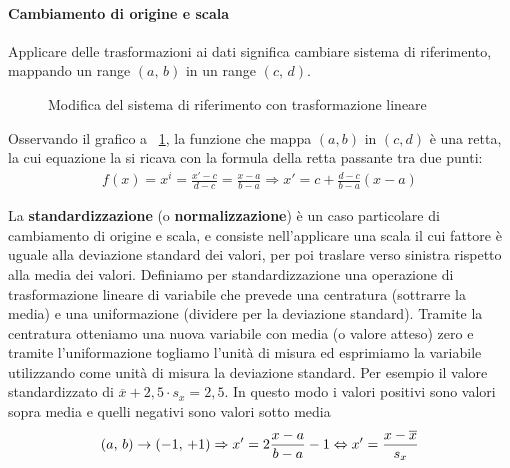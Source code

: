\paragraph{Cambiamento di origine e scala}
Applicare delle trasformazioni ai dati significa cambiare sistema di riferimento, mappando un range $(a, \, b)$ in un range $(c, \, d)$. 

\begin{figure}[h]
\vspace*{\abovedisplayskip}
\centering
{}
\caption{Modifica del sistema di riferimento con trasformazione lineare}
\label{fig:transform}
\vspace*{\abovedisplayskip}
\end{figure}

\noindent Osservando il grafico a \figurename \ \ref{fig:transform}, la funzione che mappa $(a,b)$ in $(c,d)$ è una retta, la cui equazione la si ricava con la formula della retta passante tra due punti: \begin{align*}
f(x) = x^i = 
\frac{x'-c}{d-c} = \frac{x-a}{b-a} \Rightarrow
x' = c + \frac{d-c}{b-a}(x-a)
\end{align*}

\noindent La \textbf{standardizzazione} (o \textbf{normalizzazione}) è un caso particolare di cambiamento di origine e scala, e consiste nell’applicare una scala il cui fattore è uguale alla deviazione standard dei valori, per poi traslare verso sinistra rispetto alla media dei valori. Definiamo per standardizzazione una operazione di trasformazione lineare di variabile che prevede una centratura (sottrarre la media) e una uniformazione (dividere per la deviazione standard). Tramite la centratura otteniamo una nuova variabile con media (o valore atteso) zero e tramite l'uniformazione togliamo l'unità di misura ed esprimiamo la variabile utilizzando come unità di misura la deviazione standard. Per esempio il valore standardizzato di $\overline{x} + 2,5 \cdot s_x = 2,5$. In questo modo i valori positivi sono valori sopra media e quelli negativi sono valori sotto media \[
(a, \, b) \rightarrow (-1, \, +1) \Rightarrow x' = 2 \frac{x-a}{b-a} -1 \Leftrightarrow x' = \frac{x - \overline x}{\mathnormal{s}_x}
\]

